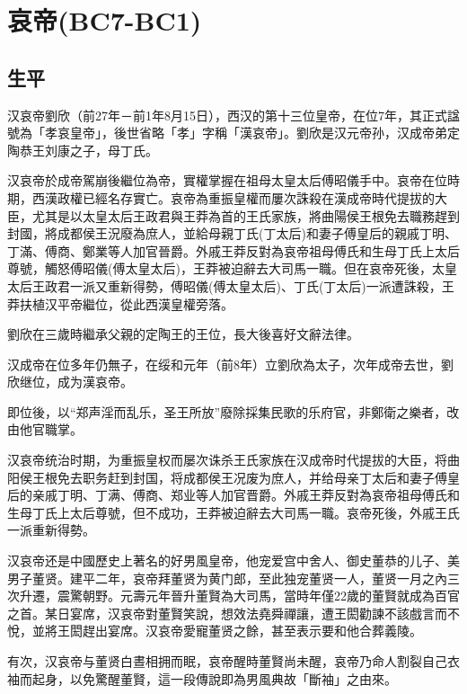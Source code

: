 
\section{哀帝\tiny(BC7-BC1)}

\subsection{生平}

汉哀帝劉欣（前27年－前1年8月15日），西汉的第十三位皇帝，在位7年，其正式諡號為「孝哀皇帝」，後世省略「孝」字稱「漢哀帝」。劉欣是汉元帝孙，汉成帝弟定陶恭王刘康之子，母丁氏。

汉哀帝於成帝駕崩後繼位為帝，實權掌握在祖母太皇太后傅昭儀手中。哀帝在位時期，西漢政權已經名存實亡。哀帝為重振皇權而屢次誅殺在漢成帝時代提拔的大臣，尤其是以太皇太后王政君與王莽為首的王氏家族，將曲陽侯王根免去職務趕到封國，將成都侯王況廢為庶人，並給母親丁氏(丁太后)和妻子傅皇后的親戚丁明、丁滿、傅商、鄭業等人加官晉爵。外戚王莽反對為哀帝祖母傅氏和生母丁氏上太后尊號，觸怒傅昭儀(傅太皇太后)，王莽被迫辭去大司馬一職。但在哀帝死後，太皇太后王政君一派又重新得勢，傅昭儀(傅太皇太后)、丁氏(丁太后)一派遭誅殺，王莽扶植汉平帝繼位，從此西漢皇權旁落。

劉欣在三歲時繼承父親的定陶王的王位，長大後喜好文辭法律。

汉成帝在位多年仍無子，在绥和元年（前8年）立劉欣為太子，次年成帝去世，劉欣继位，成为漢哀帝。

即位後，以“郑声淫而乱乐，圣王所放”廢除採集民歌的乐府官，非鄭衛之樂者，改由他官職掌。

汉哀帝统治时期，为重振皇权而屡次诛杀王氏家族在汉成帝时代提拔的大臣，将曲阳侯王根免去职务赶到封国，将成都侯王况废为庶人，并给母亲丁太后和妻子傅皇后的亲戚丁明、丁满、傅商、郑业等人加官晋爵。外戚王莽反對為哀帝祖母傅氏和生母丁氏上太后尊號，但不成功，王莽被迫辭去大司馬一職。哀帝死後，外戚王氏一派重新得勢。

汉哀帝还是中國歷史上著名的好男風皇帝，他宠爱宫中舍人、御史董恭的儿子、美男子董贤。建平二年，哀帝拜董贤为黄门郎，至此独宠董贤一人，董贤一月之內三次升遷，震驚朝野。元壽元年晉升董賢為大司馬，當時年僅22歲的董賢就成為百官之首。某日宴席，汉哀帝對董賢笑說，想效法堯舜禪讓，遭王閎勸諫不該戲言而不悅，並將王閎趕出宴席。汉哀帝愛寵董贤之餘，甚至表示要和他合葬義陵。

有次，汉哀帝与董贤白晝相拥而眠，哀帝醒時董賢尚未醒，哀帝乃命人割裂自己衣袖而起身，以免驚醒董賢，這一段傳說即為男風典故「斷袖」之由來。

